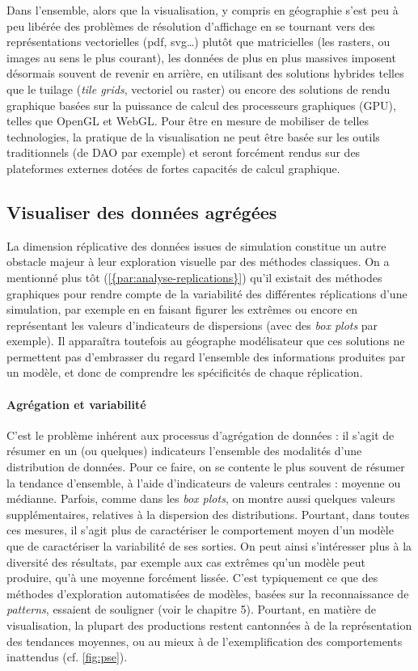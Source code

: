 \documentclass[a4paper, 12pt]{article}
\begin{document}
Dans l'ensemble, alors que la visualisation, y compris en géographie s'est peu à peu libérée des problèmes de résolution d'affichage en se tournant vers des représentations vectorielles (\textsf{pdf}, \textsf{svg}\ldots) plutôt que matricielles (les rasters, ou \og images\fg{} au sens le plus courant), les données de plus en plus massives imposent désormais souvent de revenir en arrière, en utilisant des solutions hybrides telles que le tuilage (\textit{tile grids}, vectoriel ou raster) ou encore des solutions de rendu graphique basées sur la puissance de calcul des processeurs graphiques (GPU), telles que \textsf{OpenGL} et \textsf{WebGL}.
Pour être en mesure de mobiliser de telles technologies, la pratique de la visualisation ne peut être basée sur les outils traditionnels (de DAO par exemple) et seront forcément rendus sur des plateformes externes dotées de fortes capacités de calcul graphique.
	
\subsection{Visualiser des données agrégées}

La dimension réplicative des données issues de simulation constitue un autre obstacle majeur à leur exploration visuelle par des méthodes classiques.
On a mentionné plus tôt (\cref{{par:analyse-replications}}) qu'il existait des méthodes graphiques pour rendre compte de la variabilité des différentes réplications d'une simulation, par exemple en en faisant figurer les extrêmes ou encore en représentant les valeurs d'indicateurs de dispersions (avec des \textit{box plots} par exemple).
Il apparaîtra toutefois au géographe modélisateur que ces solutions ne permettent pas d'embrasser du regard l'ensemble des informations produites par un modèle, et donc de comprendre les spécificités de chaque réplication.

\paragraph{Agrégation et variabilité}

C'est le problème inhérent aux processus d'agrégation de données : il s'agit de résumer en un (ou quelques) indicateurs l'ensemble des modalités d'une distribution de données.
Pour ce faire, on se contente le plus souvent de résumer la tendance d'ensemble, à l'aide d'indicateurs de valeurs centrales : moyenne ou médianne.
Parfois, comme dans les \textit{box plots}, on montre aussi quelques valeurs supplémentaires, relatives à la dispersion des distributions.
Pourtant, dans toutes ces mesures, il s'agit plus de caractériser le comportement moyen d'un modèle que de caractériser la variabilité de ses sorties.
On peut ainsi s'intéresser plus à la diversité des résultats, par exemple aux cas extrêmes qu'un modèle peut produire, qu'à une moyenne forcément lissée.
C'est typiquement ce que des méthodes d'exploration automatisées de modèles, basées sur la reconnaissance de \textit{patterns}, essaient de souligner (voir le chapitre 5).
Pourtant, en matière de visualisation, la plupart des productions restent cantonnées à de la représentation des tendances moyennes, ou au mieux à de l'exemplification des comportements inattendus (cf. \cref{fig:pse}).
\end{document}
